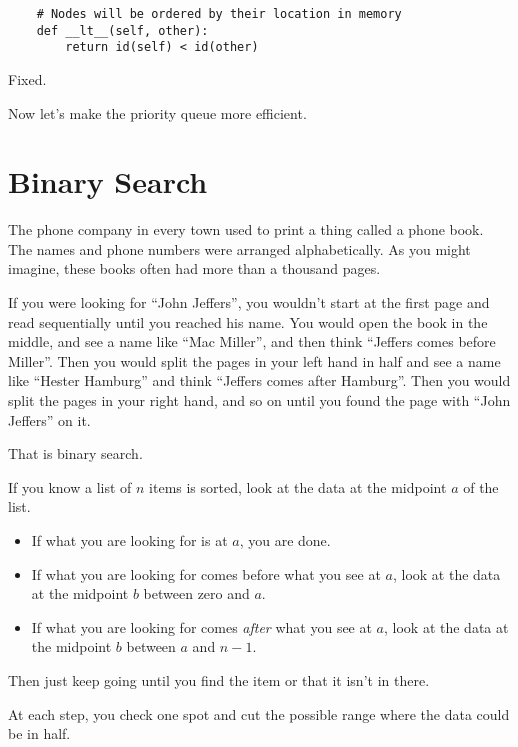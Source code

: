 \begin{verbatim}
    # Nodes will be ordered by their location in memory
    def __lt__(self, other):
        return id(self) < id(other)
\end{verbatim}

Fixed.

Now let's make the priority queue more efficient.

\section{Binary Search}

The phone company in every town used to print a thing called a phone
book. The names and phone numbers were arranged alphabetically.  As
you might imagine, these books often had more than a thousand pages.

If you were looking for ``John Jeffers'', you wouldn't start at the
first page and read sequentially until you reached his name.  You
would open the book in the middle, and see a name like ``Mac Miller'',
and then think ``Jeffers comes before Miller''.  Then you would split
the pages in your left hand in half and see a name like ``Hester
Hamburg'' and think ``Jeffers comes after Hamburg''.  Then you would
split the pages in your right hand, and so on until you found the page
with ``John Jeffers'' on it.

That is binary search.

If you know a list of $n$ items is sorted, look at the data at the midpoint $a$ of
the list.
\begin{itemize}
\item If what you are looking for is at $a$, you are done.
 
\item If what you are looking for comes before what you see at
$a$, look at the data at the midpoint $b$ between zero and $a$.

\item If what you are looking for comes \textit{after}  what you see at
$a$, look at the data at the midpoint $b$ between $a$ and $n-1$.
\end{itemize}
Then just keep going until you find the item or that it isn't in there.

At each step, you check one spot and cut the possible range where the data could be in half.

